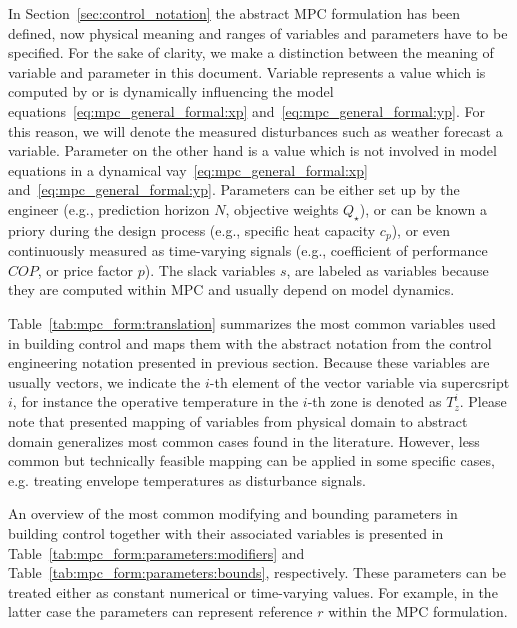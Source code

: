 \documentclass[10pt]{article}
\begin{document}
In Section~\ref{sec:control_notation} the abstract MPC formulation has been defined, now physical meaning and ranges of variables and parameters have to be specified.
% 
For the sake of clarity, we make a distinction between the meaning of variable and parameter in this document.
Variable represents a value which is computed by or is dynamically influencing the model equations~\eqref{eq:mpc_general_formal:xp} and~\eqref{eq:mpc_general_formal:yp}. For this reason, we will denote the measured disturbances such as weather forecast a variable.
Parameter on the other hand is a value which is not involved in model equations in a dynamical vay~\eqref{eq:mpc_general_formal:xp} and~\eqref{eq:mpc_general_formal:yp}. Parameters can be
 either set up by the engineer (e.g., prediction horizon $N$, objective weights $Q_{\star}$), or can be known a priory during the design process (e.g., specific  heat capacity $c_p$), or even continuously measured as time-varying signals (e.g., coefficient of performance $COP$, or price factor $p$).
The slack variables $s$, are labeled as variables because they are computed within MPC and usually depend on model dynamics.

Table~\ref{tab:mpc_form:translation} summarizes the most common
variables used in building control and maps them with the abstract
notation from the control engineering notation presented in previous section. 
Because these variables are usually vectors, we indicate the
$i$-th element of the vector variable via supercsript $i$,
for instance the operative temperature in the $i$-th zone is denoted as $T_z^i$.
Please note that presented mapping of  variables from physical domain to abstract domain generalizes most common cases found in the literature. However, less common 
but technically feasible mapping can be applied in some specific cases, e.g. treating envelope temperatures as  disturbance signals.


An overview of the most common modifying and bounding parameters in building control together with their associated variables is presented in Table~\ref{tab:mpc_form:parameters:modifiers} and Table~\ref{tab:mpc_form:parameters:bounds}, respectively.
These parameters can be treated either as constant numerical  or time-varying values. For example, in the latter case the parameters can represent reference $r$ within the MPC formulation.
\end{document}
